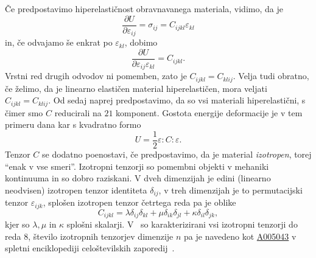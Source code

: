\documentclass[12pt,a4paper,twoside]{article}
\theoremstyle{definition} %
\theoremstyle{plain} %
\numberwithin{equation}{section}
\newcommand{\eps}{\varepsilon}
\newcommand{\dpar}[2]{\ensuremath{\frac{\partial #1}{\partial #2}}}
\begin{document}
Če predpostavimo hiperelastičnost obravnavanega materiala, vidimo, da je
\begin{equation}
  \dpar{U}{\eps_{ij}} = \sigma_{ij} = C_{ijkl}\eps_{kl}
\end{equation}
in, če odvajamo še enkrat po $\eps_{kl}$, dobimo
\begin{equation}
  \dpar{U}{\eps_{ij}\eps_{kl}} = C_{ijkl}.
\end{equation}
Vrstni red drugih odvodov ni pomemben, zato je $C_{ijkl} = C_{klij}$. Velja tudi obratno, če želimo,
da je linearno elastičen material hiperelastičen, mora veljati $C_{ijkl} = C_{klij}$.
Od sedaj naprej predpostavimo, da so vsi materiali hiperelastični, s čimer smo $C$ reducirali
na $21$ komponent. Gostota energije deformacije je v tem primeru dana kar s kvadratno formo
\begin{equation}
  U = \frac12 \eps:C:\eps.
  \label{eq:energy}
\end{equation}
Tenzor $C$ se dodatno poenostavi, če predpostavimo, da je material \emph{izotropen}, torej ``enak
v vse smeri''. Izotropni tenzorji so pomembni objekti v mehaniki kontinuuma in so dobro
raziskani. V dveh dimenzijah je edini (linearno neodvisen) izotropen tenzor identiteta
$\delta_{ij}$, v treh dimenzijah je to permutacijski tenzor $\eps_{ijk}$, splošen izotropen tenzor
četrtega reda pa je oblike
\begin{equation}
  \label{eq:isotropic}
   C_{ijkl} = \lambda \delta_{ij}\delta_{kl} + \mu \delta_{ik}\delta_{jl} +
   \kappa\delta_{il}\delta_{jk},
\end{equation}
kjer so $\lambda, \mu$ in $\kappa$ splošni skalarji. V~\cite{kearsley1975linearly} so
karakterizirani vsi izotropni tenzorji do reda 8, število izotropnih tenzorjev
dimenzije $n$ pa je navedeno kot \href{http://oeis.org/A005043}{A005043} v spletni enciklopediji
celoštevilskih zaporedij~\cite{oeis}.
\end{document}

